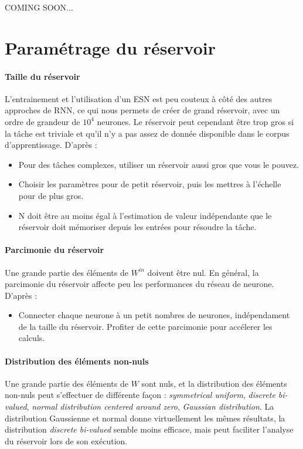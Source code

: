\documentclass[12pt]{article}
\begin{document}
\begin{center}
COMING SOON... 
\end{center}


\appendix

\section{Paramétrage du réservoir}

\paragraph{Taille du réservoir}
L'entrainement et l'utilisation d'un ESN est peu couteux à côté des autres approches de RNN, ce qui nous permets de créer de grand réservoir, avec un ordre de grandeur de $10^{4}$ neurones. Le réservoir peut cependant être trop gros si la tâche est triviale et qu'il n'y a pas assez de donnée disponible dans le corpus d'apprentissage.\newline
D'après \cite{Lukosevicius12}:
\begin{itemize}
\item Pour des tâches complexes, utiliser un réservoir aussi gros que vous le pouvez.
\item Choisir les paramètres pour de petit réservoir, puis les mettres à l'échelle pour de plus gros.
\item N doit être au moins égal à l'estimation de valeur indépendante que le réservoir doit mémoriser depuis les entrées pour résoudre la tâche.
\end{itemize}

\paragraph{Parcimonie du réservoir}
Une grande partie des éléments de $W^{in}$ doivent être nul. En général, la parcimonie du réservoir affecte peu les performances du réseau de neurone.\newline
D'après \cite{Lukosevicius12}:
\begin{itemize}
\item Connecter chaque neurone à un petit nombres de neurones, indépendament de la taille du réservoir. Profiter de cette parcimonie pour accélerer les calculs.
\end{itemize}

\paragraph{Distribution des éléments non-nuls}
Une grande partie des éléments de $W$ sont nuls, et la distribution des éléments non-nuls peut s'effectuer de différente façon : \textit{symmetrical uniform}, \textit{discrete bi-valued}, \textit{normal distribution centered around zero}, \textit{Gaussian distribution}.\newline
La distribution Gaussienne et normal donne virtuellement les mêmes résultats, la distribution \textit{discrete bi-valued} semble moins efficace, mais peut faciliter l'analyse du réservoir lors de son exécution.
\end{document}

